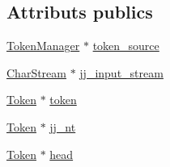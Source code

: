 \subsection*{Attributs publics}
\begin{DoxyCompactItemize}
\item 
\hyperlink{classvhdl_1_1parser_1_1_token_manager}{Token\+Manager} $\ast$ \hyperlink{classvhdl_1_1parser_1_1_vhdl_parser_a14fcf5077ae6f4d2c6fb1be4f4dba05c}{token\+\_\+source}
\item 
\hyperlink{classvhdl_1_1parser_1_1_char_stream}{Char\+Stream} $\ast$ \hyperlink{classvhdl_1_1parser_1_1_vhdl_parser_a0031fd33a9b88412133c8d89a67ac244}{jj\+\_\+input\+\_\+stream}
\item 
\hyperlink{classvhdl_1_1parser_1_1_token}{Token} $\ast$ \hyperlink{classvhdl_1_1parser_1_1_vhdl_parser_a608c6d5c2adcbf09ce69f0123e223893}{token}
\item 
\hyperlink{classvhdl_1_1parser_1_1_token}{Token} $\ast$ \hyperlink{classvhdl_1_1parser_1_1_vhdl_parser_a0dd07751fdbbf311b3480ccb3c4b1dfe}{jj\+\_\+nt}
\item 
\hyperlink{classvhdl_1_1parser_1_1_token}{Token} $\ast$ \hyperlink{classvhdl_1_1parser_1_1_vhdl_parser_acb53e5f00331138d6e68d2ab0cc7e270}{head}
\end{DoxyCompactItemize}
